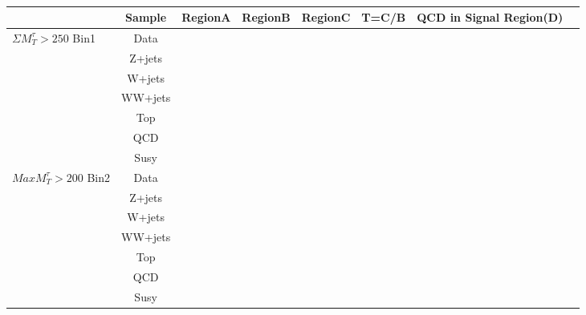\begin{table}
\begin{center}
\begin{tabular}{|l|c|c|c|c|c|c|c|}
\hline
 & Sample & RegionA & RegionB & RegionC & T=C/B & QCD in Signal Region(D)\\
\hline\hline
\multirow{7}{*}{$\Sigma M_{T}^{\tau}>250 $ Bin1}& Data& & & & \multirow{7}{*}{} & \multirow{7}{*}{}\\ \cline{2-5}

&Z+jets& & & & & \\\cline{2-5}

&W+jets& & & & & \\\cline{2-5}

&WW+jets& & & & & \\\cline{2-5}

&Top& & & & & \\\cline{2-5}
&QCD& & & & & \\\cline{2-5}
&Susy& & & & & \\\cline{2-5}
\hline\hline\hline
\multirow{7}{*}{$Max M_{T}^{\tau}>200$ Bin2}&Data  &  &  & \multirow{7}{*}{} & \multirow{7}{*}{} &  \\
\cline{2-5}


&Z+jets& & & & & \\\cline{2-5}

&W+jets& & & & & \\\cline{2-5}

&WW+jets& & & & & \\\cline{2-5}

&Top& & & & & \\\cline{2-5}
&QCD& & & & & \\\cline{2-5}
&Susy& & & & & \\\cline{2-5}
\hline\hline



\end{tabular}
\caption{ }
\label{2QCDbg}
\end{center}
\end{table}



















